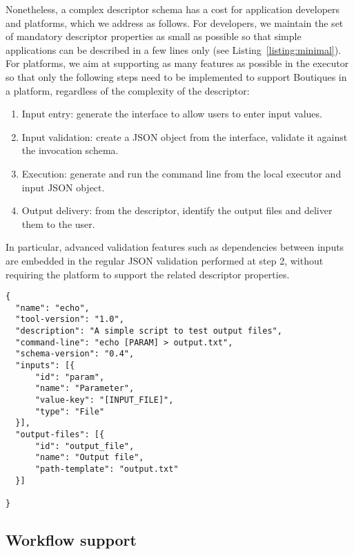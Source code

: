 \documentclass[a4paper,num-refs]{oup-contemporary}
\newcommand{\boutiques}{Boutiques\xspace}
\begin{document}
Nonetheless, a complex descriptor schema has a cost for application
developers and platforms, which we address as follows. For developers,
we maintain the set of mandatory descriptor properties as small as
possible so that simple applications can be described in a few lines
only (see Listing~\ref{listing:minimal}). For platforms, we aim at
supporting as many features as possible in the executor so that
only the following steps need to be implemented to support \boutiques
in a platform, regardless of the complexity of the descriptor:
\begin{enumerate}
  \item Input entry: generate the interface to allow users to enter
    input values.
  \item Input validation: create a JSON object from the interface,
    validate it against the invocation schema.
  \item Execution: generate and run the command line from the local
    executor and input JSON object.
  \item Output delivery: from the descriptor, identify the output files
    and deliver them to the user.
\end{enumerate}
In particular, advanced validation features such as dependencies
between inputs are embedded in the regular JSON validation performed
at step 2, without requiring the platform to support the related
descriptor properties.
\begin{listing}
\begin{verbatim}
{
  "name": "echo",
  "tool-version": "1.0",
  "description": "A simple script to test output files",
  "command-line": "echo [PARAM] > output.txt",
  "schema-version": "0.4",
  "inputs": [{
      "id": "param",
      "name": "Parameter",
      "value-key": "[INPUT_FILE]",
      "type": "File"
  }],
  "output-files": [{
      "id": "output_file",
      "name": "Output file",
      "path-template": "output.txt"
  }]

}
\end{verbatim}
\caption{A minimal \boutiques descriptor.} 
\label{listing:minimal}
\end{listing}

\subsection{Workflow support}
\end{document}
